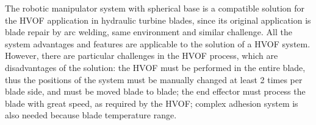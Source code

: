 


The robotic manipulator system with spherical base is a compatible solution
for the HVOF application in hydraulic turbine blades, since its
original application is blade repair by arc welding, same environment and
similar challenge. All the system advantages and features are applicable to
the solution of a HVOF system. However, there are particular challenges in the
HVOF process, which are disadvantages of the solution: the HVOF must be
performed in the entire blade, thus the positions of the system must be
manually changed at least 2 times per blade side, and must be moved blade to
blade; the end effector must process the blade with great speed, as required
by the HVOF; complex adhesion system is also needed because blade temperature
range.

